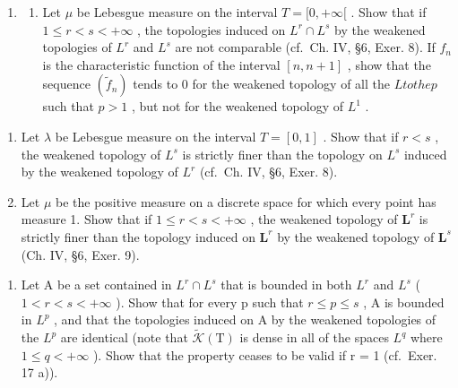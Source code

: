 \begin{enumerate}
\def\labelenumi{\arabic{enumi})}
\setcounter{enumi}{16}
\tightlist
\item
  \begin{enumerate}
  \def\labelenumii{\alph{enumii})}
  \tightlist
  \item
    Let \(\mu\) be Lebesgue measure on the interval \(T = [0, +\infty[\) . Show that if \(1 \leqslant r < s < +\infty\) , the topologies induced on \(L^r \cap L^s\) by the weakened topologies of \(L^r\) and \(L^s\) are not comparable (cf.~Ch. IV, §6, Exer. 8). If \(f_n\) is the characteristic function of the interval \([n, n+1]\) , show that the sequence \((\widetilde{f}_n)\) tends to 0 for the weakened topology of all the \(L to the p\) such that \(p > 1\) , but not for the weakened topology of \(L^1\) .
  \end{enumerate}
\end{enumerate}

\begin{enumerate}
\def\labelenumi{\alph{enumi})}
\setcounter{enumi}{1}
\item
  Let \(\lambda\) be Lebesgue measure on the interval \(T = [0,1]\) . Show that if \(r < s\) , the weakened topology of \(L^s\) is strictly finer than the topology on \(L^s\) induced by the weakened topology of \(L^r\) (cf.~Ch. IV, §6, Exer. 8).
\item
  Let \(\mu\) be the positive measure on a discrete space for which every point has measure 1. Show that if \(1 \leqslant r < s < +\infty\) , the weakened topology of \(\mathbf{L}^r\) is strictly finer than the topology induced on \(\mathbf{L}^r\) by the weakened topology of \(\mathbf{L}^s\) (Ch. IV, §6, Exer. 9).
\end{enumerate}

\begin{enumerate}
\def\labelenumi{\arabic{enumi})}
\setcounter{enumi}{17}
\tightlist
\item
  Let A be a set contained in \(L^{r} \cap L^{s}\) that is bounded in both \(L^{r}\) and \(L^{s}\) ( \(1 < r < s < +\infty\) ). Show that for every p such that \(r \leqslant p \leqslant s\) , A is bounded in \(L^{p}\) , and that the topologies induced on A by the weakened topologies of the \(L^{p}\) are identical (note that \(\widetilde{\mathcal{K}}(\mathrm{T})\) is dense in all of the spaces \(L^{q}\) where \(1 \leqslant q < +\infty\) ). Show that the property ceases to be valid if r = 1 (cf.~Exer. 17 a)).
\end{enumerate}

